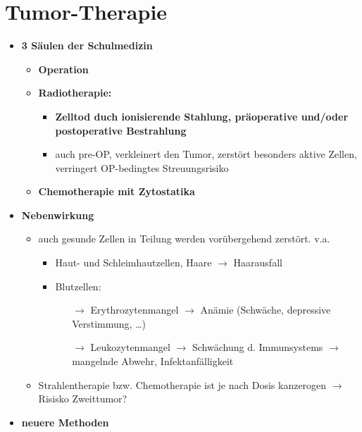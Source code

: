  \section{Tumor-Therapie}
	\begin{itemize}
		\item \textbf{3 Säulen der Schulmedizin}
			\begin{itemize}
				\item \textbf{Operation}
				\item \textbf{Radiotherapie:}
					\begin{itemize}
						\item \textbf{Zelltod duch ionisierende Stahlung, präoperative und/oder postoperative Bestrahlung}
						\item auch pre-OP, verkleinert den Tumor, zerstört besonders aktive Zellen, verringert OP-bedingtes Streuungsrisiko
					\end{itemize}					
				\item \textbf{Chemotherapie mit Zytostatika}
			\end{itemize}
		\item \textbf{Nebenwirkung}
			\begin{itemize}
				\item auch gesunde Zellen in Teilung werden vorübergehend zerstört. v.a.
					\begin{itemize}
						\item Haut- und Schleimhautzellen, Haare $\rightarrow$ Haarausfall
						\item Blutzellen:
							\begin{itemize}
								\item[$\rightarrow$] Erythrozytenmangel $\rightarrow$ Anämie (Schwäche, depressive Verstimmung, …)
								\item[$\rightarrow$] Leukozytenmangel $\rightarrow$ Schwächung d. Immunsystems $\rightarrow$ mangelnde Abwehr, Infektanfälligkeit
							\end{itemize}
					\end{itemize} 
				\item Strahlentherapie bzw. Chemotherapie ist je nach Dosis kanzerogen $\rightarrow$ Risisko Zweittumor?
			\end{itemize}
		\item \textbf{neuere Methoden}
	\end{itemize}
\pagebreak
